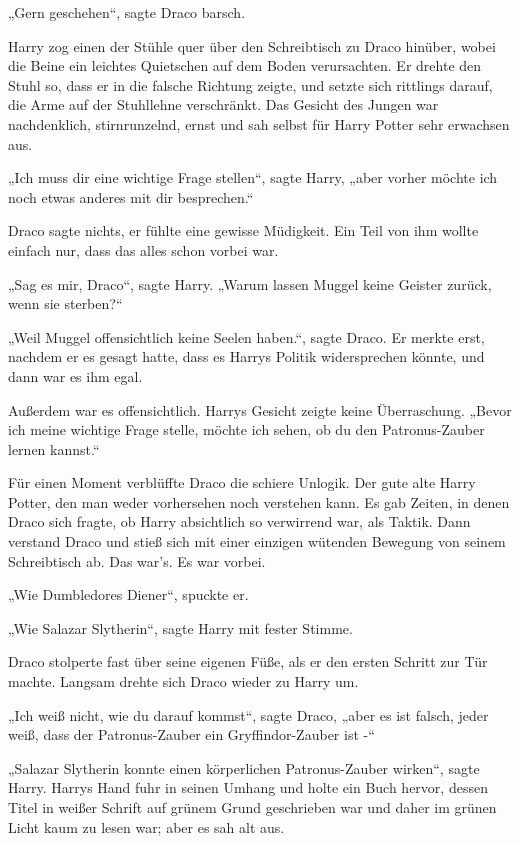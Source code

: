 {„Gern geschehen“, sagte Draco barsch.

Harry zog einen der Stühle quer über den Schreibtisch zu Draco hinüber, wobei die Beine ein leichtes Quietschen auf dem Boden verursachten. Er drehte den Stuhl so, dass er in die falsche Richtung zeigte, und setzte sich rittlings darauf, die Arme auf der Stuhllehne verschränkt. Das Gesicht des Jungen war nachdenklich, stirnrunzelnd, ernst und sah selbst für Harry Potter sehr erwachsen aus.

„Ich muss dir eine wichtige Frage stellen“, sagte Harry, „aber vorher möchte ich noch etwas anderes mit dir besprechen.“

Draco sagte nichts, er fühlte eine gewisse Müdigkeit. Ein Teil von ihm wollte einfach nur, dass das alles schon vorbei war.

„Sag es mir, Draco“, sagte Harry. „Warum lassen Muggel keine Geister zurück, wenn sie sterben?“

„Weil Muggel offensichtlich keine Seelen haben.“, sagte Draco. Er merkte erst, nachdem er es gesagt hatte, dass es Harrys Politik widersprechen könnte, und dann war es ihm egal.

Außerdem war es offensichtlich. Harrys Gesicht zeigte keine Überraschung. „Bevor ich meine wichtige Frage stelle, möchte ich sehen, ob du den Patronus-Zauber lernen kannst.“

Für einen Moment verblüffte Draco die schiere Unlogik. Der gute alte Harry Potter, den man weder vorhersehen noch verstehen kann. Es gab Zeiten, in denen Draco sich fragte, ob Harry absichtlich so verwirrend war, als Taktik. Dann verstand Draco und stieß sich mit einer einzigen wütenden Bewegung von seinem Schreibtisch ab. Das war's. Es war vorbei.

„Wie Dumbledores Diener“, spuckte er.

„Wie Salazar Slytherin“, sagte Harry mit fester Stimme.

Draco stolperte fast über seine eigenen Füße, als er den ersten Schritt zur Tür machte. Langsam drehte sich Draco wieder zu Harry um.

„Ich weiß nicht, wie du darauf kommst“, sagte Draco, „aber es ist falsch, jeder weiß, dass der Patronus-Zauber ein Gryffindor-Zauber ist -“

„Salazar Slytherin konnte einen körperlichen Patronus-Zauber wirken“, sagte Harry. Harrys Hand fuhr in seinen Umhang und holte ein Buch hervor, dessen Titel in weißer Schrift auf grünem Grund geschrieben war und daher im grünen Licht kaum zu lesen war; aber es sah alt aus.

}

